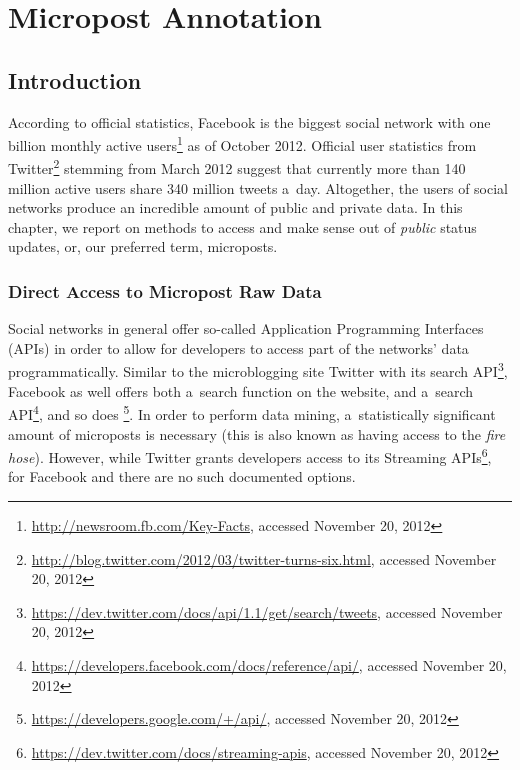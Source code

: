 \chapter{Micropost Annotation}

\ifpdf
    \graphicspath{{4_micropost_annotation/figures/PNG/}{4_micropost_annotation/figures/PDF/}{4_micropost_annotation/figures/}}
\else
    \graphicspath{{4_micropost_annotation/figures/EPS/}{4_micropost_annotation/figures/}}
\fi

\section{Introduction}
\label{sec:introduction}

According to official statistics, Facebook is the biggest
social network with one billion monthly active
users\footnote{\url{http://newsroom.fb.com/Key-Facts},
accessed November 20, 2012}
as of October 2012.
Official user statistics from
Twitter\footnote{\url{http://blog.twitter.com/2012/03/twitter-turns-six.html},
accessed November 20, 2012}
stemming from March 2012 suggest
that currently more than 140 million active users
share 340 million tweets a~day.
Altogether, the users of social networks
produce an incredible amount of public and private data.
In this chapter, we report on methods to access and make sense
out of \emph{public} status updates,
or, our preferred term, microposts.

\subsection{Direct Access to Micropost Raw Data}

Social networks in general offer so-called
Application Programming Interfaces (APIs)
in order to allow for developers to access
part of the networks' data programmatically.
Similar to the microblogging site Twitter
with its search
API\footnote{\url{https://dev.twitter.com/docs/api/1.1/get/search/tweets},
accessed November 20, 2012},
Facebook as well offers both a~search function on the website,
and a~search
API\footnote{\url{https://developers.facebook.com/docs/reference/api/},
accessed November 20, 2012},
and so does
\googleplus\footnote{\url{https://developers.google.com/+/api/},
accessed November 20, 2012}.
In order to perform data mining,
a~statistically significant amount of microposts is necessary
(this is also known as having access to the \emph{fire hose}).
However, while Twitter grants developers access to its Streaming
APIs\footnote{\url{https://dev.twitter.com/docs/streaming-apis},
accessed November 20, 2012},
for Facebook and \googleplus there are no such documented options.


